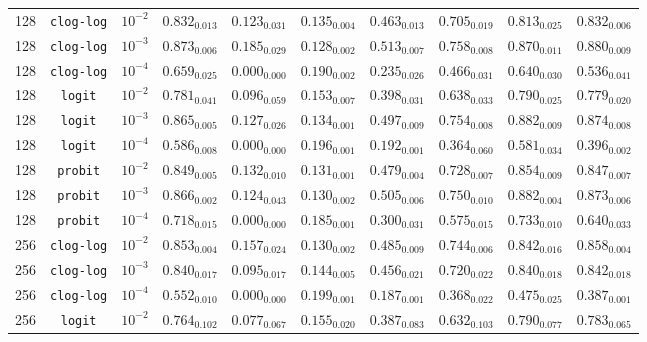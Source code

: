 \documentclass[preprint]{elsarticle}
\begin{document}
\begin{table}[!t]
{\begin{tabular}{c@{\hskip 0.15cm}c@{\hskip 0.15cm}c@{\hskip 0.15cm}c@{\hskip 0.15cm}c@{\hskip 0.15cm}c@{\hskip 0.15cm}c@{\hskip 0.15cm}c@{\hskip 0.15cm}c@{\hskip 0.15cm}c}
		128 & \texttt{clog-log} & $10^{-2}$ & $0.832_{0.013}$ & $0.123_{0.031}$ & $0.135_{0.004}$ & $0.463_{0.013}$ & $0.705_{0.019}$ & $0.813_{0.025}$ & $0.832_{0.006}$\\
		128 & \texttt{clog-log} & $10^{-3}$ & $0.873_{0.006}$ & $\mathbf{0.185_{0.029}}$ & $0.128_{0.002}$ & $0.513_{0.007}$ & $0.758_{0.008}$ & $0.870_{0.011}$ & $0.880_{0.009}$\\
		128 & \texttt{clog-log} & $10^{-4}$ & $0.659_{0.025}$ & $0.000_{0.000}$ & $0.190_{0.002}$ & $0.235_{0.026}$ & $0.466_{0.031}$ & $0.640_{0.030}$ & $0.536_{0.041}$\\
		128 & \texttt{logit} & $10^{-2}$ & $0.781_{0.041}$ & $0.096_{0.059}$ & $0.153_{0.007}$ & $0.398_{0.031}$ & $0.638_{0.033}$ & $0.790_{0.025}$ & $0.779_{0.020}$\\
		128 & \texttt{logit} & $10^{-3}$ & $0.865_{0.005}$ & $0.127_{0.026}$ & $0.134_{0.001}$ & $0.497_{0.009}$ & $0.754_{0.008}$ & $0.882_{0.009}$ & $0.874_{0.008}$\\
		128 & \texttt{logit} & $10^{-4}$ & $0.586_{0.008}$ & $0.000_{0.000}$ & $0.196_{0.001}$ & $0.192_{0.001}$ & $0.364_{0.060}$ & $0.581_{0.034}$ & $0.396_{0.002}$\\
		128 & \texttt{probit} & $10^{-2}$ & $0.849_{0.005}$ & $0.132_{0.010}$ & $0.131_{0.001}$ & $0.479_{0.004}$ & $0.728_{0.007}$ & $0.854_{0.009}$ & $0.847_{0.007}$\\
		128 & \texttt{probit} & $10^{-3}$ & $0.866_{0.002}$ & $0.124_{0.043}$ & $0.130_{0.002}$ & $0.505_{0.006}$ & $0.750_{0.010}$ & $0.882_{0.004}$ & $0.873_{0.006}$\\
		128 & \texttt{probit} & $10^{-4}$ & $0.718_{0.015}$ & $0.000_{0.000}$ & $0.185_{0.001}$ & $0.300_{0.031}$ & $0.575_{0.015}$ & $0.733_{0.010}$ & $0.640_{0.033}$\\
		256 & \texttt{clog-log} & $10^{-2}$ & $0.853_{0.004}$ & $0.157_{0.024}$ & $0.130_{0.002}$ & $0.485_{0.009}$ & $0.744_{0.006}$ & $0.842_{0.016}$ & $0.858_{0.004}$\\
		256 & \texttt{clog-log} & $10^{-3}$ & $0.840_{0.017}$ & $0.095_{0.017}$ & $0.144_{0.005}$ & $0.456_{0.021}$ & $0.720_{0.022}$ & $0.840_{0.018}$ & $0.842_{0.018}$\\
		256 & \texttt{clog-log} & $10^{-4}$ & $0.552_{0.010}$ & $0.000_{0.000}$ & $0.199_{0.001}$ & $0.187_{0.001}$ & $0.368_{0.022}$ & $0.475_{0.025}$ & $0.387_{0.001}$\\
		256 & \texttt{logit} & $10^{-2}$ & $0.764_{0.102}$ & $0.077_{0.067}$ & $0.155_{0.020}$ & $0.387_{0.083}$ & $0.632_{0.103}$ & $0.790_{0.077}$ & $0.783_{0.065}$\\

\end{tabular}}
\end{table}
\end{document}
